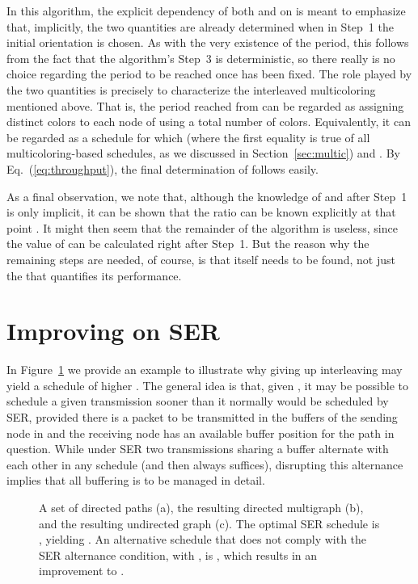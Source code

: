 \documentclass{article}
\begin{document}
In this algorithm, the explicit dependency of both  and
 on  is meant to emphasize that, implicitly, the two
quantities are already determined when in Step~1 the initial orientation
 is chosen. As with the very existence of the period, this follows
from the fact that the algorithm's Step~3 is deterministic, so there really is
no choice regarding the period to be reached once  has been fixed. The
role played by the two quantities is precisely to characterize the interleaved
multicoloring mentioned above. That is, the period reached from  can
be regarded as assigning  distinct colors to each node of 
using a total number  of colors. Equivalently, it can be
regarded as a schedule  for which
 (where the first equality is
true of all multicoloring-based schedules, as we discussed in
Section~\ref{sec:multic}) and . By
Eq.~(\ref{eq:throughput}), the final determination of  follows
easily.

As a final observation, we note that, although the knowledge of 
and  after Step~1 is only implicit, it can be shown that the ratio
 can be known explicitly at that point \cite{bg89}. It
might then seem that the remainder of the algorithm is useless, since the value
of  can be calculated right after Step~1. But the reason why the
remaining steps are needed, of course, is that  itself needs to be
found, not just the  that quantifies its performance.

\section{Improving on SER}\label{sec:sera}

In Figure~\ref{fig5} we provide an example to illustrate why giving up
interleaving may yield a schedule  of higher . The
general idea is that, given , it may be possible to schedule a given
transmission sooner than it normally would be scheduled by SER, provided there
is a packet to be transmitted in the buffers of the sending node in  and the
receiving node has an available buffer position for the path in question. While
under SER two transmissions sharing a buffer alternate with each other in any
schedule (and then  always suffices), disrupting this alternance implies
that all buffering is to be managed in detail.

\begin{figure}[t]
\centering
{}
\caption{A set of  directed paths (a), the resulting directed multigraph
 (b), and the resulting undirected graph  (c). The optimal SER schedule is
,
yielding . An alternative schedule that does not comply
with the SER alternance condition, with , is
,
which results in an improvement to .}
\label{fig5}
\end{figure}
\end{document}
